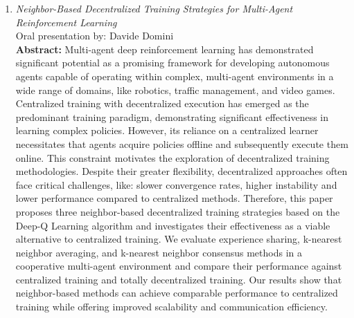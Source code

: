 \documentclass[runningheads]{llncs}
\begin{document}
\begin{enumerate}
    \item \emph{Neighbor-Based Decentralized Training Strategies for Multi-Agent Reinforcement Learning}~\cite{DBLP:conf/sac/MalucelliDAV25} \\ Oral presentation by: Davide Domini \\
    \textbf{Abstract: }
    Multi-agent deep reinforcement learning has demonstrated significant potential as a promising framework for developing 
     autonomous agents capable of operating within complex, multi-agent environments  
     in a wide range of domains, like robotics, traffic management, and video games.
    Centralized training with decentralized execution has emerged as the predominant training paradigm, 
     demonstrating significant effectiveness in learning complex policies.
    However, its reliance on a centralized learner necessitates that agents acquire policies offline and subsequently 
     execute them online.
    This constraint motivates the exploration of decentralized training methodologies.
    Despite their greater flexibility, decentralized approaches often face critical challenges, like: 
     slower convergence rates, higher instability and lower performance compared to centralized methods. 
    Therefore, this paper proposes three neighbor-based decentralized training 
     strategies based on the Deep-Q Learning algorithm and investigates their effectiveness as 
     a viable alternative to centralized training. 
    We evaluate experience sharing, k-nearest neighbor averaging, and k-nearest neighbor consensus methods 
     in a cooperative multi-agent environment and compare their performance against centralized training
     and totally decentralized training. 
    Our results show that neighbor-based methods can achieve comparable performance to centralized training 
     while offering improved scalability and communication efficiency.
    

\end{enumerate}
\end{document}
